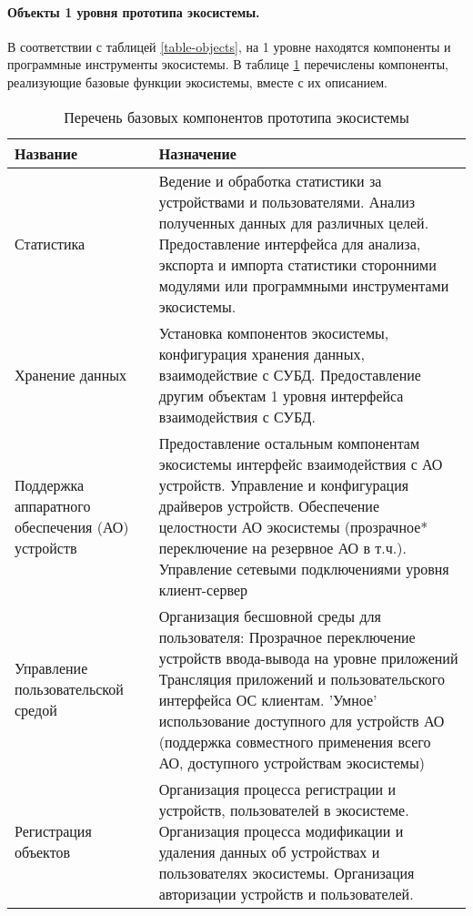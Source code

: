 \paragraph*{Объекты 1 уровня прототипа экосистемы.}
В соответствии с таблицей \ref{table-objects}, на 1 уровне находятся компоненты и программные инструменты экосистемы. В таблице \ref{table-components} перечислены компоненты, реализующие базовые функции экосистемы, вместе с их описанием.
\begin{table}[htpb]
   \captionsetup{justification=raggedright,labelfont=md,textfont=md}
   \caption{Перечень базовых компонентов прототипа экосистемы}
   \label{table-components}
   \begin{tabularx}{\textwidth}{|>{\centering}p{}|X|}
      \cline{1-2}
      Название & Назначение \\
      \hline
      Статистика & Ведение и обработка статистики за устройствами и пользователями. Анализ полученных данных для различных целей. Предоставление интерфейса для анализа, экспорта и импорта статистики сторонними модулями или программными инструментами экосистемы. \\
      \hline
      Хранение данных & Установка компонентов экосистемы, конфигурация хранения данных, взаимодействие с СУБД. Предоставление другим объектам 1 уровня интерфейса взаимодействия с СУБД. \\
      \hline
      Поддержка аппаратного обеспечения (АО) устройств & Предоставление остальным компонентам экосистемы интерфейс взаимодействия с АО устройств. Управление и конфигурация драйверов устройств. Обеспечение целостности АО экосистемы (прозрачное* переключение на резервное АО в т.ч.). Управление сетевыми подключениями уровня клиент-сервер \\
      \hline
      Управление пользовательской средой & Организация бесшовной среды для пользователя:
      Прозрачное переключение устройств ввода-вывода на уровне приложений
      Трансляция приложений и пользовательского интерфейса ОС клиентам.
      'Умное' использование доступного для устройств АО (поддержка совместного применения всего АО, доступного устройствам экосистемы) \\
      \hline
      Регистрация объектов & Организация процесса регистрации и устройств, пользователей в экосистеме. Организация процесса модификации и удаления данных об устройствах и пользователях экосистемы. Организация авторизации устройств и пользователей. \\
      \hline
   \end{tabularx}
\end{table}
